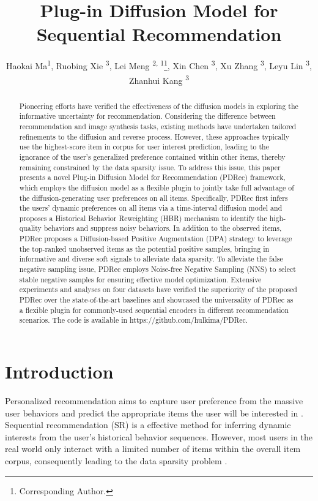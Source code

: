 \documentclass[letterpaper]{article} %
\title{Plug-in Diffusion Model for Sequential Recommendation}
\author{
    Haokai Ma\textsuperscript{\rm 1},
    Ruobing Xie \textsuperscript{\rm 3},
    Lei Meng \textsuperscript{\rm 2, \rm 1}\thanks{Corresponding Author.},
    Xin Chen \textsuperscript{\rm 3},
    Xu Zhang \textsuperscript{\rm 3},
    Leyu Lin \textsuperscript{\rm 3},
    Zhanhui Kang \textsuperscript{\rm 3}
}
\begin{document}
\maketitle

\begin{abstract}
Pioneering efforts have verified the effectiveness of the diffusion models in exploring the informative uncertainty for recommendation. Considering the difference between recommendation and image synthesis tasks, existing methods have undertaken tailored refinements to the diffusion and reverse process. However, these approaches typically use the highest-score item in corpus for user interest prediction, leading to the ignorance of the user's generalized preference contained within other items, thereby remaining constrained by the data sparsity issue. To address this issue, this paper presents a novel Plug-in Diffusion Model for Recommendation (PDRec) framework, which employs the diffusion model as a flexible plugin to jointly take full advantage of the diffusion-generating user preferences on all items. Specifically, PDRec first infers the users' dynamic preferences on all items via a time-interval diffusion model and proposes a Historical Behavior Reweighting (HBR) mechanism to identify the high-quality behaviors and suppress noisy behaviors. In addition to the observed items, PDRec proposes a Diffusion-based Positive Augmentation (DPA) strategy to leverage the top-ranked unobserved items as the potential positive samples, bringing in informative and diverse soft signals to alleviate data sparsity. To alleviate the false negative sampling issue, PDRec employs Noise-free Negative Sampling (NNS) to select stable negative samples for ensuring effective model optimization. Extensive experiments and analyses on four datasets have verified the superiority of the proposed PDRec over the state-of-the-art baselines and showcased the universality of PDRec as a flexible plugin for commonly-used sequential encoders in different recommendation scenarios. The code is available in https://github.com/hulkima/PDRec.
\end{abstract}

\section{Introduction}
Personalized recommendation aims to capture user preference from the massive user behaviors and predict the appropriate items the user will be interested in \cite{RS3,RS2,RS1}. Sequential recommendation (SR) is a effective method for inferring dynamic interests from the user's historical behavior sequences\cite{DGSR, MLP4Rec, ICLRec}. However, most users in the real world only interact with a limited number of items within the overall item corpus, consequently leading to the data sparsity problem \cite{xia2021knowledge, P2FCDR, chen2023enhanced}. 
\end{document}
